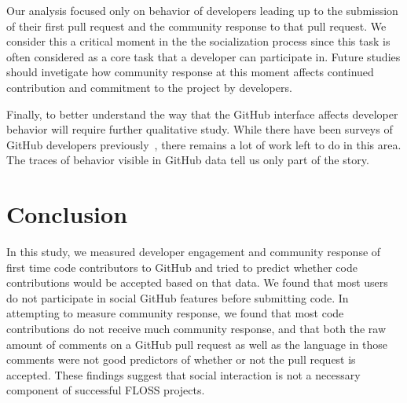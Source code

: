 \documentclass{sigchi}
\begin{document}
Our analysis focused only on behavior of developers leading up to the submission
of their first pull request and the community response to that pull request. We
consider this a critical moment in the the socialization process since this task
is often considered as a core task that a developer can participate in. Future
studies should invetigate how community response at this moment affects
continued contribution and commitment to the project by developers.

Finally, to better understand the way that the GitHub interface affects
developer behavior will require further qualitative study. While there have been
surveys of GitHub developers previously~\cite{mcdonald_performance_2013}, there
remains a lot of work left to do in this area. The traces of behavior visible in
GitHub data tell us only part of the story.

\section{Conclusion}

In this study, we measured developer engagement and community response of first
time code contributors to GitHub and tried to predict whether code contributions
would be accepted based on that data. We found that most users do not
participate in social GitHub features before submitting code. In attempting to
measure community response, we found that most code contributions do not receive
much community response, and that both the raw amount of comments on a GitHub
pull request as well as the language in those comments were not good predictors
of whether or not the pull request is accepted. These findings suggest that
social interaction is not a necessary component of successful FLOSS projects.

%
%


\end{document}
